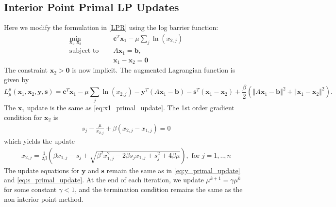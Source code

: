 \documentclass{article}
\begin{document}
\subsection*{Interior Point Primal LP Updates}
Here we modify the formulation in \eqref{LPR} using the log barrier function:
\begin{align}
\min_{ \mathbf{x}_{1}, \mathbf{x}_{2}} &\quad \mathbf{c}^T\mathbf{x}_1 - \mu \sum_j \ln( {x}_{2,j} )\tag{LPRB}\label{LPRB} \\
\text{subject to  \ \  } &\quad  A \mathbf{x}_{1} = \mathbf{b},  \nonumber \\
&\quad \mathbf{x}_{1}  - \mathbf{x}_{2} = \mathbf{0} \nonumber
\end{align}
The constraint $\mathbf{x}_{2} > \mathbf{0}$ is now implicit. The augmented Lagrangian function is given by
\[
L_{\mu}^{p}(\mathbf{x}_{1},\mathbf{x}_{2},\mathbf{y}, \mathbf{s})=\mathbf{c}^{T}\mathbf{x}_{1}-\mu\sum_{j}\ln\left(x_{2,j}\right)-\mathbf{y}^{T}\left(A\mathbf{x}_{1}-\mathbf{b}\right)-\mathbf{s}^{T}\left(\mathbf{x}_{1}-\mathbf{x}_{2}\right)+\frac{\beta}{2}\left(\left\Vert A\mathbf{x}_{1}-\mathbf{b}\right\Vert ^{2}+\left\Vert \mathbf{x}_{1}-\mathbf{x}_{2}\right\Vert ^{2}\right).
\]
The $\mathbf{x}_1$ update is the same as \eqref{eq:x1_primal_update}. The 1st order gradient condition for $\mathbf{x}_2$ is
\begin{align}
s_j - \frac{\mu}{x_{2,j}} + \beta(x_{2,j} - x_{1,j}) = 0
\end{align}
which yields the update
\begin{align}
x_{2,j} = \frac{1}{2\beta}\left(\beta x_{1,j} - s_j  + \sqrt{\beta^2 x_{1,j}^2 - 2\beta s_j x_{1,j} + s_j^2 + 4\beta\mu } \right), \text{ for $j = 1,..,n$}
\end{align}
The update equations for $\mathbf{y}$ and $\mathbf{s}$ remain the same as in \eqref{eq:y_primal_update} and \eqref{eq:s_primal_update}. At the end of each iteration, we update $\mu^{k+1} = \gamma \mu^k$ for some constant $\gamma<1$, and the termination condition remains the same as the non-interior-point method. 
\end{document}
